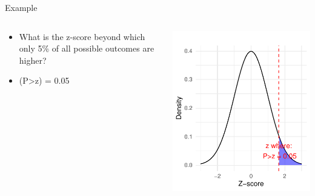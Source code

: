 \documentclass[
  ignorenonframetext,
]{beamer}
\providecommand{\tightlist}{%
  \setlength{\itemsep}{0pt}\setlength{\parskip}{0pt}}
\begin{document}
\begin{frame}{Example}
\label{example-3}
\begin{columns}[T]
\begin{column}{0.5\textwidth}
\vspace{1cm}

\begin{itemize}
\tightlist
\item
  What is the z-score beyond which only 5\% of all possible outcomes are
  higher?
\end{itemize}

\begin{itemize}
\tightlist
\item
  (P\textgreater z) = 0.05
\end{itemize}
\end{column}

\begin{column}{0.5\textwidth}
\vspace{1cm}

\includegraphics{M5-Hypothesis-Testing,-Probability-and-Distribution_files/figure-beamer/unnamed-chunk-22-1.pdf}
\end{column}
\end{columns}
\end{frame}
\end{document}

